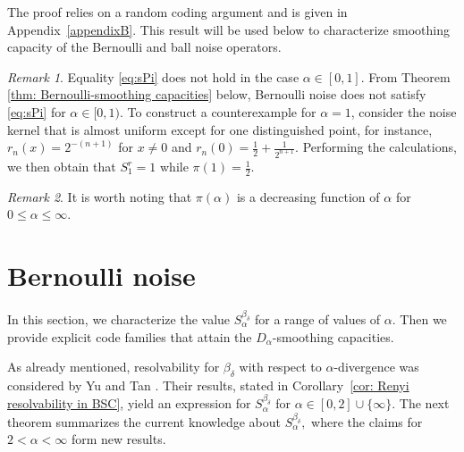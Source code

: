 \documentclass{amsart}
\theoremstyle{remark}
\newtheorem{remark}{Remark}
\begin{document}
The proof relies on a random coding argument and is given in Appendix~\ref{appendixB}.
This result will be used below to characterize smoothing capacity of the Bernoulli and ball noise operators.
\begin{remark}
  Equality \eqref{eq:sPi} does not hold in the case $\alpha \in [0,1]$. From Theorem \ref{thm: Bernoulli-smoothing capacities} below, Bernoulli noise does not satisfy \eqref{eq:sPi} for $\alpha \in [0,1)$. To construct a counterexample for $\alpha =1$, consider  the noise kernel that is almost uniform except for one distinguished point, for instance,  $r_n(x) = 2^{-(n+1)}$ for $x\ne 0$ and
  $r_n(0)=\frac12+\frac1{2^{n+1}}.$ Performing the calculations, we then obtain
that $S_1^{r}=1$ while $\pi(1)=\frac12.$
\end{remark}

\begin{remark}
    It is worth noting that $\pi(\alpha)$ is a decreasing function of $\alpha$ for $0\le\alpha\le\infty.$
\end{remark}

\section{Bernoulli noise}\label{sec: Bernoulli}
In this section, we characterize the value $S_\alpha^{\beta_\delta}$ for a range of values of $\alpha$. Then we provide explicit code families that attain the $D_{\alpha}$-smoothing capacities.  

As already mentioned, resolvability for $\beta_\delta$ with respect to $\alpha$-divergence was considered by Yu and Tan 
\cite{yu2018renyi}. Their results, stated in Corollary~\ref{cor: Renyi resolvability in BSC}, yield an expression
for $S_{\alpha}^{\beta_\delta}$ for $\alpha \in [0,2]\cup\{\infty\}$. 
The next theorem summarizes the current knowledge about $S_\alpha^{\beta_\delta},$ 
where the claims for $2<\alpha<\infty$ form new results.
\end{document}
